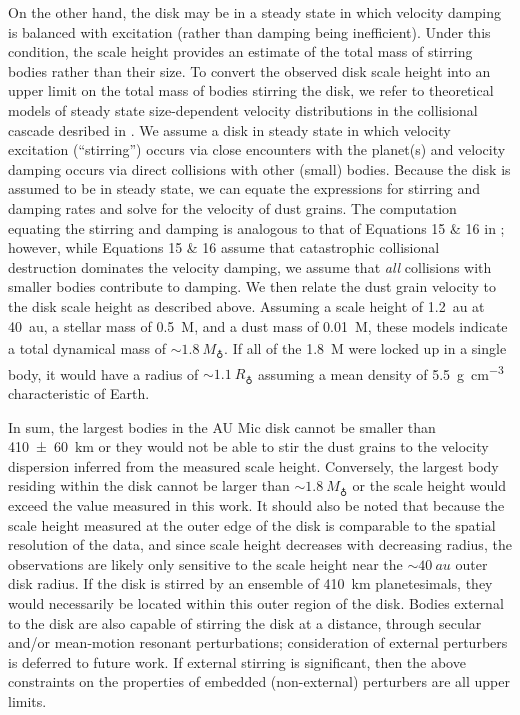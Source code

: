 \documentclass[modern]{aastex62}
\begin{document}
On the other hand, the disk may be in a steady state in which velocity damping is balanced with excitation (rather than damping being inefficient).
Under this condition, the scale height provides an estimate of the total mass of stirring bodies rather than their size.
To convert the observed disk scale height into an upper limit on the total mass of bodies stirring the disk, we refer to theoretical models of steady state size-dependent velocity distributions in the collisional cascade desribed in \citet{pan&schlichting12}.
We assume a disk in steady state in which velocity excitation (``stirring'') occurs via close encounters with the planet(s) and velocity damping occurs via direct collisions with other (small) bodies. 
Because the disk is assumed to be in steady state, we can equate the expressions for stirring and damping rates and solve for the velocity of dust grains. 
The computation equating the stirring and damping is analogous to that of Equations 15 \& 16 in \citet{pan&schlichting12}; however, while Equations 15 \& 16 assume that catastrophic collisional destruction dominates the velocity damping, we assume that \textit{all} collisions with smaller bodies contribute to damping.
We then relate the dust grain velocity to the disk scale height as described above.
Assuming a scale height of \SI{1.2}{au} at \SI{40}{au}, a stellar mass of \SI{0.5}{M_\sun}, and a dust mass of \SI{0.01}{M_\earth}, these models indicate a total dynamical mass of $\sim\SI{1.8}{M_\earth}$.
If all of the \SI{1.8}{M_\earth} were locked up in a single body, it would have a radius of $\sim \SI{1.1}{R_\earth}$ assuming a mean density of \SI{5.5}{\g.\cm^{-3}} characteristic of Earth.

In sum, the largest bodies in the AU Mic disk cannot be smaller than \SI{410 \pm 60}{km} or they would not be able to stir the dust grains to the velocity dispersion inferred from the measured scale height.
Conversely, the largest body residing within the disk cannot be larger than $\sim \SI{1.8}{M_\earth}$ or the scale height would exceed the value measured in this work.
It should also be noted that because the scale height measured at the outer edge of the disk is comparable to the spatial resolution of the data, and since scale height decreases with decreasing radius, the observations are likely only sensitive to the scale height near the $\sim \SI{40}{au}$ outer disk radius. 
If the disk is stirred by an ensemble of \SI{410}{km} planetesimals, they would necessarily be located within this outer region of the disk. 
Bodies external to the disk are also capable of stirring the disk at a distance, through secular and/or mean-motion resonant perturbations; consideration of external perturbers is deferred to future work.
If external stirring is significant, then the above constraints on the properties of embedded (non-external) perturbers are all upper limits.
\end{document}
